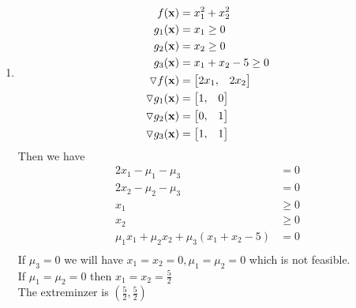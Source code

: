 \documentclass{article}
\begin{document}
\begin{enumerate} [label=(\alph*)]
\item 
\begin{align*} 
f(\boldsymbol{\mathrm{x}}) & = x_1^2 + x_2 ^ 2 \\
g_1(\boldsymbol{\mathrm{x}}) & = x_1 \geq 0 \\
g_2(\boldsymbol{\mathrm{x}}) & = x_2 \geq 0 \\
g_3(\boldsymbol{\mathrm{x}}) & = x_1 +x_2 -5 \geq 0 \\
\triangledown f(\boldsymbol{\mathrm{x}}) &= \begin{bmatrix} 2x_1, & 2x_2 \end{bmatrix} \\
\triangledown g_1(\boldsymbol{\mathrm{x}}) &= \begin{bmatrix} 1, & 0  \end{bmatrix} \\
\triangledown g_2(\boldsymbol{\mathrm{x}}) &= \begin{bmatrix} 0, & 1 \end{bmatrix}  \\
\triangledown g_3(\boldsymbol{\mathrm{x}}) &= \begin{bmatrix} 1, & 1 \end{bmatrix}  \\
\end{align*}
Then we have \begin{align*} 
2x_1 - \mu_1 -\mu_3 & = 0 \\
2x_2 - \mu_2 -\mu_3 & = 0 \\
x_1 & \geq 0 \\
x_2 & \geq 0 \\
\mu_1 x_1 + \mu_2x_2 + \mu_3 (x_1 + x_2 -5)  & = 0 \\
\end{align*} 
If $\mu_3 = 0 $ we will have $ x_1 = x_2 = 0, \mu_1 = \mu_2 = 0 $ which is not feasible. \\
If $\mu_1 = \mu_2 =  0$  then $x_1= x_2 = \frac{5}{2} $\\
The extreminzer is $(\frac{5}{2}, \frac{5}{2}) $ 



\end{enumerate}
\end{document}
